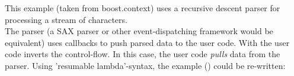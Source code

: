 \label{appendix}
This example (taken from boost.context\cite{bcontext}) uses a recursive descent
parser for processing a stream of characters.\\
The parser (a SAX parser or other event-dispatching framework would be
equivalent) uses callbacks to push parsed data to the user code. With \ectx the
user code inverts the control-flow. In this case, the user code \textit{pulls}
data from the parser.
Using 'resumable lambda'-syntax, the example () could be re-written:
